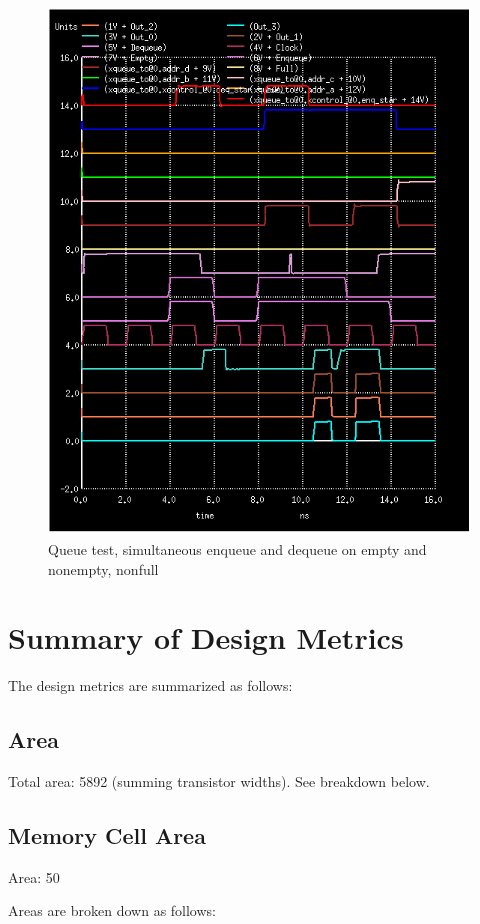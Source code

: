 \documentclass[12pt]{report}
\begin{document}
\begin{figure}[H]
  \centering
    \includegraphics[width=1.0\textwidth]{queue_toplevel_test_enqdeq_empty_and_middle.PNG}
  \caption{Queue test, simultaneous enqueue and dequeue on empty and nonempty, nonfull}
\end{figure}

\newpage
\section*{Summary of Design Metrics}
The design metrics are summarized as follows:
\subsection*{Area}
Total area: 5892 (summing transistor widths). See breakdown below.
\subsection*{Memory Cell Area}
Area: 50

Areas are broken down as follows:\\
\end{document}
